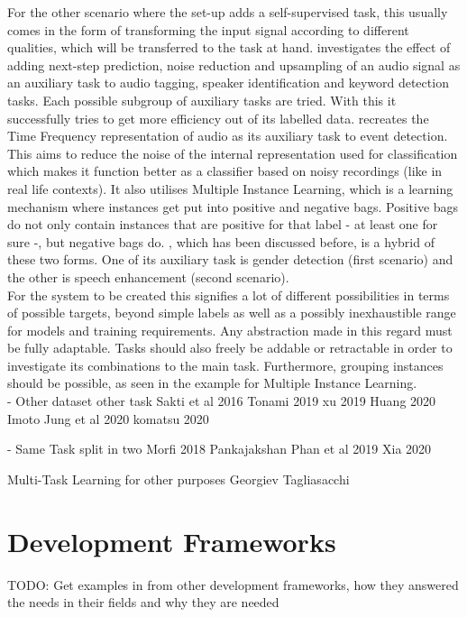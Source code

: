 For the other scenario where the set-up adds a self-supervised task, this usually comes in the form of transforming the input signal according to different qualities, which will be transferred to the task at hand. \cite{lee2019label} investigates the effect of adding next-step prediction, noise reduction and upsampling of an audio signal as an auxiliary task to audio tagging, speaker identification and keyword detection tasks. Each possible subgroup of auxiliary tasks are tried.  With this it successfully tries to get more efficiency out of its labelled data. \cite{deshmukh2020multi} recreates the Time Frequency representation of audio as its auxiliary task to event detection. This aims to reduce the noise of the internal representation used for classification which makes it function better as a classifier based on noisy recordings (like in real life contexts). It also utilises Multiple Instance Learning, which is a learning mechanism where instances get put into positive and negative bags.  Positive bags do not only contain instances that are positive for that label - at least one for sure -, but negative bags do. \cite{lu2004multitask}, which has been discussed before, is a hybrid of these two forms. One of its auxiliary task is gender detection (first scenario) and the other is speech enhancement (second scenario). \\

For the system to be created this signifies a lot of different possibilities in terms of possible targets, beyond simple labels as well as a possibly inexhaustible range for models and training requirements. Any abstraction made in this regard must be fully adaptable. Tasks should also freely be addable or retractable in order to investigate its combinations to the main task. Furthermore, grouping instances should be possible, as seen in the example for Multiple Instance Learning. \\

- Other dataset other task
Sakti et al 2016
Tonami 2019
xu 2019
Huang 2020
Imoto
Jung et al 2020
komatsu 2020


- Same Task split in two
Morfi 2018
Pankajakshan
Phan et al 2019
\citep{phan2017dnn}
Xia 2020
\citep{nwe2017convolutional}


Multi-Task Learning for other purposes
Georgiev
Tagliasacchi




\section{Development Frameworks}
TODO: Get examples in from other development frameworks, how they answered the needs in their fields and why they are needed

